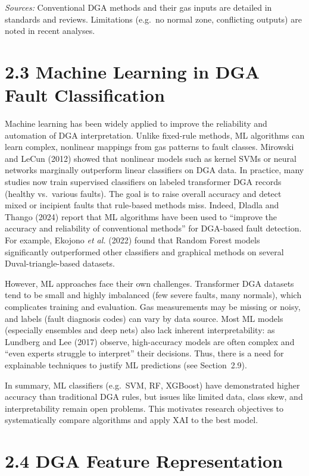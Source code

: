 \emph{Sources:} Conventional DGA methods and their gas inputs are
detailed in standards and reviews. Limitations (e.g.~no normal zone,
conflicting outputs) are noted in recent analyses.

\section{2.3 Machine Learning in DGA Fault
Classification}\label{machine-learning-in-dga-fault-classification}

Machine learning has been widely applied to improve the reliability and
automation of DGA interpretation. Unlike fixed-rule methods, ML
algorithms can learn complex, nonlinear mappings from gas patterns to
fault classes. Mirowski and LeCun (2012) showed that nonlinear models
such as kernel SVMs or neural networks marginally outperform linear
classifiers on DGA data. In practice, many studies now train supervised
classifiers on labeled transformer DGA records (healthy vs.~various
faults). The goal is to raise overall accuracy and detect mixed or
incipient faults that rule-based methods miss. Indeed, Dladla and Thango
(2024) report that ML algorithms have been used to ``improve the
accuracy and reliability of conventional methods'' for DGA-based fault
detection. For example, Ekojono \emph{et al.} (2022) found that Random
Forest models significantly outperformed other classifiers and graphical
methods on several Duval-triangle-based datasets.

However, ML approaches face their own challenges. Transformer DGA
datasets tend to be small and highly imbalanced (few severe faults, many
normals), which complicates training and evaluation. Gas measurements
may be missing or noisy, and labels (fault diagnosis codes) can vary by
data source. Most ML models (especially ensembles and deep nets) also
lack inherent interpretability: as Lundberg and Lee (2017) observe,
high-accuracy models are often complex and ``even experts struggle to
interpret'' their decisions. Thus, there is a need for explainable
techniques to justify ML predictions (see Section~2.9).

In summary, ML classifiers (e.g.~SVM, RF, XGBoost) have demonstrated
higher accuracy than traditional DGA rules, but issues like limited
data, class skew, and interpretability remain open problems. This
motivates research objectives to systematically compare algorithms and
apply XAI to the best model.

\section{2.4 DGA Feature
Representation}\label{dga-feature-representation}

